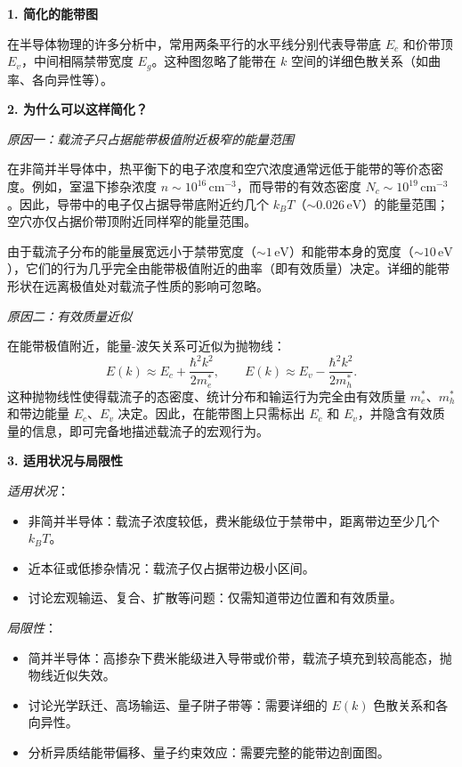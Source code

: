 \begin{derivationbox}[标准解题过程]
\textbf{1. 简化的能带图}

在半导体物理的许多分析中，常用两条平行的水平线分别代表导带底 $E_c$ 和价带顶 $E_v$，中间相隔禁带宽度 $E_g$。这种图忽略了能带在 $k$ 空间的详细色散关系（如曲率、各向异性等）。

\textbf{2. 为什么可以这样简化？}

\textit{原因一：载流子只占据能带极值附近极窄的能量范围}

在非简并半导体中，热平衡下的电子浓度和空穴浓度通常远低于能带的等价态密度。例如，室温下掺杂浓度 $n\sim10^{16}\,\text{cm}^{-3}$，而导带的有效态密度 $N_c\sim10^{19}\,\text{cm}^{-3}$。因此，导带中的电子仅占据导带底附近约几个 $k_BT$（$\sim0.026\,\text{eV}$）的能量范围；空穴亦仅占据价带顶附近同样窄的能量范围。

由于载流子分布的能量展宽远小于禁带宽度（$\sim1\,\text{eV}$）和能带本身的宽度（$\sim10\,\text{eV}$），它们的行为几乎完全由能带极值附近的曲率（即有效质量）决定。详细的能带形状在远离极值处对载流子性质的影响可忽略。

\textit{原因二：有效质量近似}

在能带极值附近，能量-波矢关系可近似为抛物线：
\[
E(k)\approx E_c+\frac{\hbar^2k^2}{2m_e^*},\qquad E(k)\approx E_v-\frac{\hbar^2k^2}{2m_h^*}.
\]
这种抛物线性使得载流子的态密度、统计分布和输运行为完全由有效质量 $m_e^*$、$m_h^*$ 和带边能量 $E_c$、$E_v$ 决定。因此，在能带图上只需标出 $E_c$ 和 $E_v$，并隐含有效质量的信息，即可完备地描述载流子的宏观行为。

\textbf{3. 适用状况与局限性}

\textit{适用状况}：
\begin{itemize}
    \item 非简并半导体：载流子浓度较低，费米能级位于禁带中，距离带边至少几个 $k_BT$。
    \item 近本征或低掺杂情况：载流子仅占据带边极小区间。
    \item 讨论宏观输运、复合、扩散等问题：仅需知道带边位置和有效质量。
\end{itemize}

\textit{局限性}：
\begin{itemize}
    \item 简并半导体：高掺杂下费米能级进入导带或价带，载流子填充到较高能态，抛物线近似失效。
    \item 讨论光学跃迁、高场输运、量子阱子带等：需要详细的 $E(k)$ 色散关系和各向异性。
    \item 分析异质结能带偏移、量子约束效应：需要完整的能带边剖面图。
\end{itemize}
\end{derivationbox}

